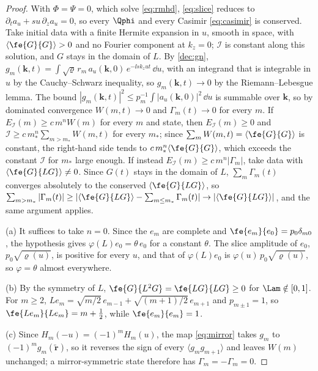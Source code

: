 \begin{proof}
With $\Phi=\Psi=0$, which solve \eqref{eq:rmhd}, \eqref{eq:slice} reduces to $\partial_ta_u+su\,\partial_za_u=0$, so every $\Qphi$ and every Casimir \eqref{eq:casimir} is conserved. Take initial data with a finite Hermite expansion in $u$, smooth in space, with $\langle\fe{G}{G}\rangle>0$ and no Fourier component at $k_z=0$; $\mathcal I$ is constant along this solution, and $G$ stays in the domain of $L$. By \eqref{dec:gn}, $g_m(\boldsymbol k,t)=\int\sqrt\varrho\,r_m\,a_u(\boldsymbol k,0)\,e^{-\ii sk_zut}\,\dd u$, with an integrand that is integrable in $u$ by the Cauchy--Schwarz inequality, so $g_m(\boldsymbol k,t)\to0$ by the Riemann--Lebesgue lemma. The bound $|g_m(\boldsymbol k,t)|^2\le p_m^{-1}\int|a_u(\boldsymbol k,0)|^2\,\dd u$ is summable over $\boldsymbol k$, so by dominated convergence $W(m,t)\to0$ and $\Gamma_m(t)\to0$ for every $m$. If $E_{\mathcal I}(m)\ge c\,m^nW(m)$ for every $m$ and state, then $E_{\mathcal I}(m)\ge0$ and $\mathcal I\ge c\,m_*^n\sum_{m>m_*}W(m,t)$ for every $m_*$; since $\sum_mW(m,t)=\langle\fe{G}{G}\rangle$ is constant, the right-hand side tends to $c\,m_*^n\langle\fe{G}{G}\rangle$, which exceeds the constant $\mathcal I$ for $m_*$ large enough. If instead $E_{\mathcal I}(m)\ge c\,m^n|\Gamma_m|$, take data with $\langle\fe{G}{LG}\rangle\ne0$. Since $G(t)$ stays in the domain of $L$, $\sum_m\Gamma_m(t)$ converges absolutely to the conserved $\langle\fe{G}{LG}\rangle$, so $\sum_{m>m_*}|\Gamma_m(t)|\ge|\langle\fe{G}{LG}\rangle-\sum_{m\le m_*}\Gamma_m(t)|\to|\langle\fe{G}{LG}\rangle|$, and the same argument applies.

(a) It suffices to take $n=0$. Since the $e_m$ are complete and $\fe{e_m}{e_0}=p_0\delta_{m0}$, the hypothesis gives $\varphi(L)e_0=\theta\,e_0$ for a constant $\theta$. The slice amplitude of $e_0$, $p_0\sqrt{\varrho(u)}$, is positive for every $u$, and that of $\varphi(L)e_0$ is $\varphi(u)\,p_0\sqrt{\varrho(u)}$, so $\varphi=\theta$ almost everywhere.

(b) By the symmetry of $L$, $\fe{G}{L^2G}=\fe{LG}{LG}\ge0$ for $\Lam\notin[0,1]$. For $m\ge2$, $Le_m=\sqrt{m/2}\,e_{m-1}+\sqrt{(m+1)/2}\,e_{m+1}$ and $p_{m\pm1}=1$, so $\fe{Le_m}{Le_m}=m+\frac12$, while $\fe{e_m}{e_m}=1$.

(c) Since $H_m(-u)=(-1)^mH_m(u)$, the map \eqref{eq:mirror} takes $g_m$ to $(-1)^mg_m(\tilde{\boldsymbol r})$, so it reverses the sign of every $\langle g_mg_{m+1}\rangle$ and leaves $W(m)$ unchanged; a mirror-symmetric state therefore has $\Gamma_m=-\Gamma_m=0$.
\end{proof}

